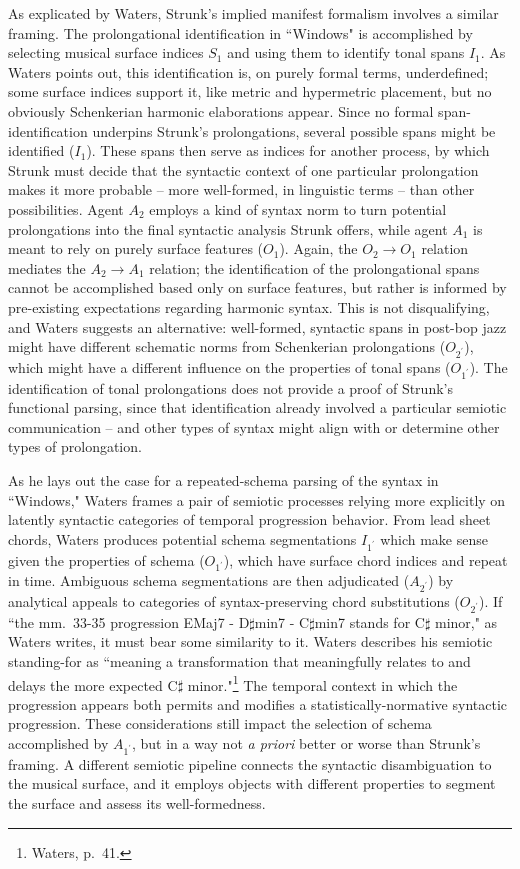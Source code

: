 As explicated by Waters, Strunk's implied manifest formalism involves a similar framing.  The prolongational identification in ``Windows" is accomplished by selecting musical surface indices $S_1$ and using them to identify tonal spans $I_1$.  As Waters points out, this identification is, on purely formal terms, underdefined; some surface indices support it, like metric and hypermetric placement, but no obviously Schenkerian harmonic elaborations appear. Since no formal span-identification underpins Strunk's prolongations, several possible spans might be identified ($I_1$).  These spans then serve as indices for another process, by which Strunk must decide that the syntactic context of one particular prolongation makes it more probable -- more well-formed, in linguistic terms -- than other possibilities.  Agent $A_2$ employs a kind of syntax norm to turn potential prolongations into the final syntactic analysis Strunk offers, while agent $A_1$ is meant to rely on purely surface features ($O_1$).  Again, the $O_2 \rightarrow O_1$ relation mediates the $A_2 \rightarrow A_1$ relation; the identification of the prolongational spans cannot be accomplished based only on surface features, but rather is informed by pre-existing expectations regarding harmonic syntax.  This is not disqualifying, and Waters suggests an alternative: well-formed, syntactic spans in post-bop jazz might have different schematic norms from Schenkerian prolongations ($O_{2^{\prime}}$), which might have a different influence on the properties of tonal spans ($O_{1^{\prime}}$).  The identification of tonal prolongations does not provide a proof of Strunk's functional parsing, since that identification already involved a particular semiotic communication -- and other types of syntax might align with or determine other types of prolongation.

As he lays out the case for a repeated-schema parsing of the syntax in ``Windows," Waters frames a pair of semiotic processes relying more explicitly on latently syntactic categories of temporal progression behavior.  From lead sheet chords, Waters produces potential schema segmentations $I_{1^{\prime}}$ which make sense given the properties of schema ($O_{1^{\prime}}$), which have surface chord indices and repeat in time.  Ambiguous schema segmentations are then adjudicated ($A_{2^{\prime}}$) by analytical appeals to categories of syntax-preserving chord substitutions ($O_{2^{\prime}}$).  If ``the mm.\ 33-35 progression EMaj7 - D$\sharp$min7 - C$\sharp$min7 stands for C$\sharp$ minor," as Waters writes, it must bear some similarity to it. Waters describes his semiotic standing-for as ``meaning a transformation that meaningfully relates to and delays the more expected C$\sharp$ minor."\footnote{Waters, p.\ 41.}  The temporal context in which the progression appears both permits and modifies a statistically-normative syntactic progression.  These considerations still impact the selection of schema accomplished by $A_{1^{\prime}}$, but in a way not \emph{a priori} better or worse than Strunk's framing.  A different semiotic pipeline connects the syntactic disambiguation to the musical surface, and it employs objects with different properties to segment the surface and assess its well-formedness.

